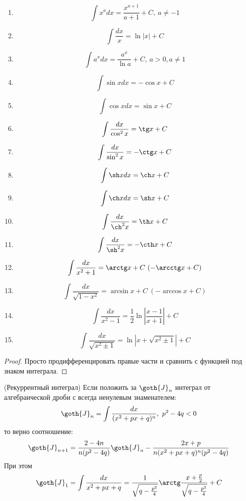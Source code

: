 \begin{enumerate}
	\item \[
		\int x^a dx = \frac{x^{a + 1}}{a + 1} + C,\ a \neq -1
	\]
	
	\item \[
		\int \frac{dx}{x} = \ln |x| + C
	\]
	
	\item \[
		\int a^x dx = \frac{a^x}{\ln a} + C,\ a > 0, a \neq 1
	\]
	
	\item \[
		\int \sin x dx = -\cos x + C
	\]
	
	\item \[
		\int \cos x dx = \sin x + C
	\]
	
	\item \[
		\int \frac{dx}{\cos^2 x} = \tg x + C
	\]
	
	\item \[
		\int \frac{dx}{\sin^2 x} = -\ctg x + C
	\]
	
	\item \[
		\int \sh x dx = \ch x + C
	\]
	
	\item \[
		\int \ch x dx = \sh x + C
	\]
	
	\item \[
		\int \frac{dx}{\ch^2 x} = \th x + C
	\]
	
	\item \[
		\int \frac{dx}{\sh^2 x} = -\cth x + C
	\]
	
	\item \[
		\int \frac{dx}{x^2 + 1} = \arctg x + C\ (-\arcctg x + C)
	\]
	
	\item \[
		\int \frac{dx}{\sqrt{1 - x^2}} = \arcsin x + C\ (-\arccos x + C)
	\]
	
	\item \[
		\int \frac{dx}{x^2 - 1} = \frac{1}{2}\ln \left|\frac{x - 1}{x + 1}\right| + C
	\]
	
	\item \[
		\int \frac{dx}{\sqrt{x^2 \pm 1}} = \ln |x + \sqrt{x^2 \pm 1}| + C
	\]
\end{enumerate}

\begin{proof}
	Просто продифференцировать правые части и сравнить с функцией под знаком интеграла.
\end{proof}

\begin{lemma} (Рекуррентный интеграл)
	Если положить за $\goth{J}_n$ интеграл от алгебраической дроби с всегда ненулевым знаменателем:
	\[
		\goth{J}_n = \int \frac{dx}{(x^2 + px + q)^n},\ p^2 - 4q < 0
	\]
	то верно соотношение:
	\[
		\goth{J}_{n + 1} = \frac{2 - 4n}{n(p^2 - 4q)}\goth{J}_n - \frac{2x + p}{n(x^2 + px + q)^n(p^2 - 4q)}
	\]
	При этом
	\[
		\goth{J}_1 = \int \frac{dx}{x^2 + px + q} = \frac{1}{\sqrt{q - \frac{p^2}{4}}} \arctg \frac{x + \frac{p}{2}}{\sqrt{q - \frac{p^2}{4}}} + C
	\]
\end{lemma}

